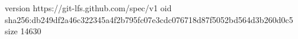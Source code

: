 version https://git-lfs.github.com/spec/v1
oid sha256:db249df2a46c322345a4f2b795fc07e3cdc076718d87f5052bd564d3b260d0c5
size 14630
